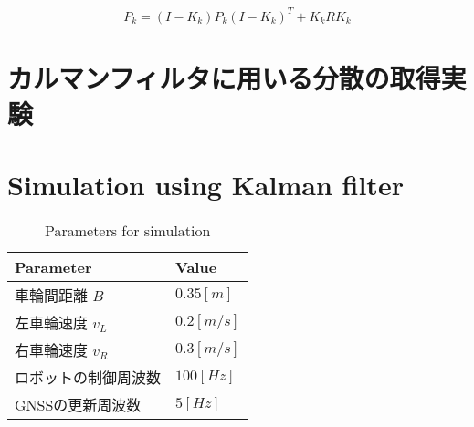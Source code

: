 \documentclass[a4paper]{article}
\begin{document}
\begin{equation}
    P_{k} = (I-K_{k})P_{k}(I-K_{k})^{T} + K_{k}RK_{k}
    \label{eq:9}
\end{equation}


\section{カルマンフィルタに用いる分散の取得実験}
%
%
%
%
%


\section{Simulation using Kalman filter}
%
%
%

\begin{table}[h]
    \caption{Parameters for simulation}
    \label{table:table1}
    \centering
    \begin{tabular}{ll}
        \hline
        Parameter & Value \\
        \hline \hline
        車輪間距離 \(B\) & \(0.35[m]\) \\
        左車輪速度 \(v_L\) & \(0.2 [m/s]\) \\
        右車輪速度 \(v_R\) & \(0.3 [m/s]\) \\
        ロボットの制御周波数 & \(100 [Hz]\) \\
        GNSSの更新周波数 & \(5 [Hz]\) \\
       \hline
    \end{tabular}
\end{table}

\end{document}
